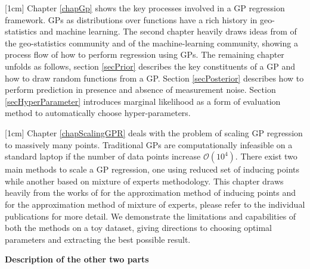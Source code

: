 [1cm]
Chapter \ref{chapGp} shows the key processes involved in a GP regression framework. GPs as distributions over functions have a rich history in geo-statistics and machine learning. The second chapter heavily draws ideas from \cite{krige2015statistical, matheron1963principles} of the geo-statistics community and \cite{Stein1999Springer, kennedy2000predicting, Rasmussen2005, mackay2003information} of the machine-learning community, showing a process flow of how to perform regression using GPs. The remaining chapter unfolds as follows, section \ref{secPrior} describes the key constituents of a GP and how to draw random functions from a GP. Section \ref{secPosterior} describes how to perform prediction in presence and absence of measurement noise. Section \ref{secHyperParameter} introduces marginal likelihood as a form of evaluation method to automatically choose hyper-parameters. 

[1cm]
Chapter \ref{chapScalingGPR} deals with the problem of scaling GP regression to massively many points. Traditional GPs are computationally infeasible on a standard laptop if the number of data points increase \(\mathcal{O}(10^4)\). There exist two main methods to scale a GP regression, one using reduced set of inducing points while another based on mixture of experts methodology. This chapter draws heavily from the works of \cite{quinonero2005unifying, seeger2003fast, Snelson06sparsegaussian, Titsias09variationallearning} for the approximation method of inducing points and \cite{cao2014generalized, tresp2000bayesian, chen2009bagging, deisenroth2015distributed} for the approximation method of mixture of experts, please refer to the individual publications for more detail. We demonstrate the limitations and capabilities of both the methods on a toy dataset, giving directions to choosing optimal parameters and extracting the best possible result.  

\textbf{Description of the other two parts}


